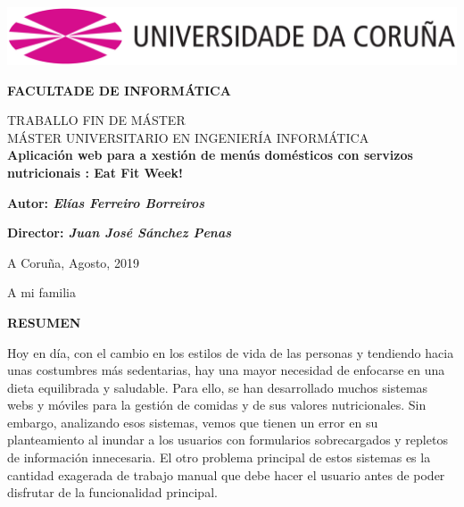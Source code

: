 \documentclass[12pt, a4paper, twoside]{book}
\begin{document}
	
	
	\thispagestyle{empty} 	
	
	\begin{center}		
		\includegraphics[width=15cm]{Imagenes/Simbolo_logo_UDC.png}
	\end{center}
	
	\vspace{2cm}
	
	\begin{center}		
		{\textbf{ FACULTADE DE INFORMÁTICA}}
			
		\vspace{1cm}
		\LARGE{ TRABALLO FIN DE MÁSTER }	\\
		\LARGE{ MÁSTER UNIVERSITARIO EN INGENIERÍA INFORMÁTICA } \\
		\vspace{1cm}	
		\LARGE{\textbf{ Aplicación web para a xestión de menús domésticos con servizos nutricionais : Eat Fit Week! }}
	\end{center}
	
	\vspace{2cm}
	\hfill \textbf{Autor: \textit{Elías Ferreiro Borreiros}}
	
	
	\hfill \textbf{Director: \textit{Juan José Sánchez Penas}} 
	
	
	\hfill A Coruña, Agosto, 2019					
	
	
	\clearpage
	
	\vspace*{\fill}
	\hfill A mi familia
	\vspace*{\fill}
	
	\clearpage
	
	\begin{center}
		\LARGE{\textbf{ RESUMEN }}	
	\end{center}
	Hoy en día, con el cambio en los estilos de vida de las personas y tendiendo hacia unas costumbres más sedentarias, hay una mayor necesidad de enfocarse en una dieta equilibrada y saludable.
	Para ello, se han desarrollado muchos sistemas webs y móviles para la gestión de comidas y de sus valores nutricionales.	Sin embargo, analizando esos sistemas, vemos que tienen un error en su planteamiento al inundar a los usuarios con formularios sobrecargados y repletos de información innecesaria. 
	El otro problema principal de estos sistemas es la cantidad exagerada de trabajo manual que debe hacer el usuario antes de poder disfrutar de la funcionalidad principal. 
\end{document}
